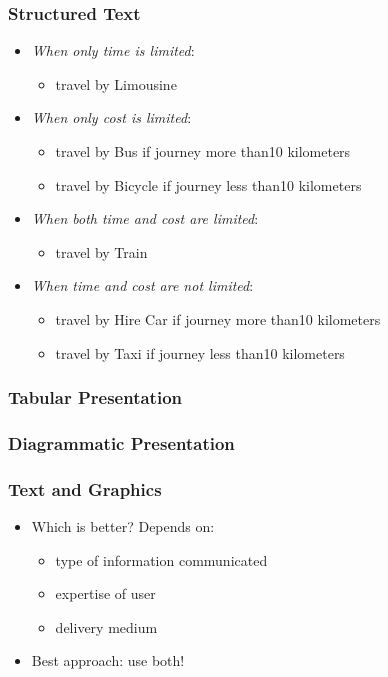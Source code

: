 \documentclass[compress,color=usenames]{beamer}
\begin{document}
\begin{frame}
\frametitle{
Structured Text}

\label{f77}
\begin{itemize}
\item {{\textit{When only time is limited}:}}
\begin{itemize}
\item travel by Limousine
\end{itemize}
\item {{\textit{When only cost is limited}:}}
\begin{itemize}
\item travel by Bus if journey more than10 kilometers
\item travel by Bicycle if journey less than10 kilometers
\end{itemize}
\item {{\textit{When both time and cost are limited}:}}
\begin{itemize}
\item travel by Train
\end{itemize}
\item {{\textit{When time and cost are not limited}:}}
\begin{itemize}
\item travel by Hire Car if journey more than10 kilometers
\item travel by Taxi if journey less than10 kilometers
\end{itemize}
\end{itemize}
 
\end{frame}

\begin{frame}
\frametitle{
Tabular Presentation}

\label{f79}
 
\end{frame}

\begin{frame}
\frametitle{
Diagrammatic Presentation}

\label{f81}
 
\end{frame}

\begin{frame}
\frametitle{
Text and Graphics}

\label{f83}
\begin{itemize}
\item {{Which is better?  Depends on:}}
\begin{itemize}
\item type of information communicated
\item expertise of user
\item delivery medium
\end{itemize}
\item {{Best approach: use both!}}
\end{itemize}
 
\end{frame}
\end{document}
